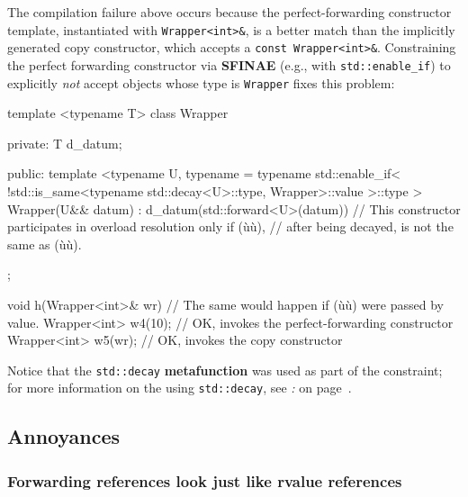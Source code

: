 \noindent The compilation failure above occurs because the perfect-forwarding
constructor template, instantiated with \texttt{Wrapper<int>\&}, is a
better match than the implicitly generated copy constructor, which
accepts a \texttt{const}~\texttt{Wrapper<int>\&}. Constraining the
perfect forwarding constructor via \textbf{SFINAE} (e.g., with
\texttt{std::enable\_if}) to explicitly \emph{not} accept objects whose
type is \texttt{Wrapper} fixes this problem:

\begin{emcppslisting}
template <typename T>
class Wrapper
{
private:
    T d_datum;

public:
    template <typename U,
        typename = typename std::enable_if<
            !std::is_same<typename std::decay<U>::type, Wrapper>::value
        >::type
    >
    Wrapper(U&& datum) : d_datum(std::forward<U>(datum)) { }
        // This constructor participates in overload resolution only if (ù{}ù),
        // after being decayed, is not the same as (ù{}ù).
};

void h(Wrapper<int>& wr)  // The same would happen if (ù{}ù) were passed by value.
{
    Wrapper<int> w4(10);  // OK, invokes the perfect-forwarding constructor
    Wrapper<int> w5(wr);  // OK, invokes the copy constructor
}
\end{emcppslisting}

\noindent Notice that the \texttt{std::decay} \textbf{metafunction} was used as
part of the constraint; for more information on the using
\texttt{std::decay}, see \textit{: } on page~\pageref{metafunctions-are-required-in-constraints}.

\subsection[Annoyances]{Annoyances}\label{annoyances-forwardingref}

\subsubsection[Forwarding references look just like rvalue references]{Forwarding references look just like rvalue references}\label{forwarding-references-look-just-like-rvalue-references}

